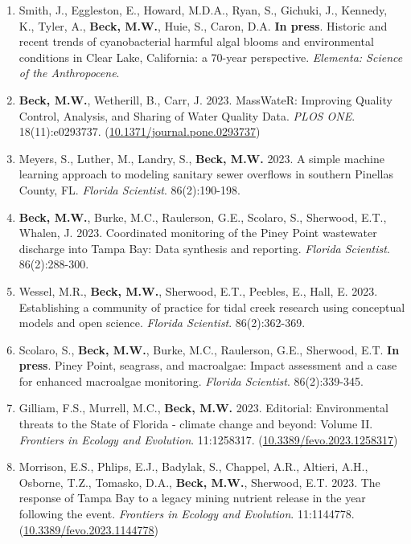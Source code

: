 \documentclass[letterpaper,12pt]{article}
\begin{document}
\begin{enumerate}

\item Smith, J., Eggleston, E., Howard, M.D.A., Ryan, S., Gichuki, J., Kennedy, K., Tyler, A., \textbf{Beck, M.W.}, Huie, S., Caron, D.A. \textbf{In press}. Historic and recent trends of cyanobacterial harmful algal blooms and environmental conditions in Clear Lake, California: a 70-year perspective. \textit{Elementa: Science of the Anthropocene}.

\item \textbf{Beck, M.W.}, Wetherill, B., Carr, J. 2023. MassWateR: Improving Quality Control, Analysis, and Sharing of Water Quality Data. \textit{PLOS ONE}. 18(11):e0293737. ({\footnotesize\href{https://doi.org/10.1371/journal.pone.0293737}{10.1371/journal.pone.0293737}})

\item Meyers, S., Luther, M., Landry, S., \textbf{Beck, M.W.} 2023. A simple machine learning approach to modeling sanitary sewer overflows in southern Pinellas County, FL. \textit{Florida Scientist}. 86(2):190-198.

\item \textbf{Beck, M.W.}, Burke, M.C., Raulerson, G.E., Scolaro, S., Sherwood, E.T., Whalen, J. 2023. Coordinated monitoring of the Piney Point wastewater discharge into Tampa Bay: Data synthesis and reporting. \textit{Florida Scientist}. 86(2):288-300.

\item Wessel, M.R., \textbf{Beck, M.W.}, Sherwood, E.T., Peebles, E., Hall, E. 2023. Establishing a community of practice for tidal creek research using conceptual models and open science. \textit{Florida Scientist}. 86(2):362-369. 

\item Scolaro, S., \textbf{Beck, M.W.}, Burke, M.C., Raulerson, G.E., Sherwood, E.T. \textbf{In press}. Piney Point, seagrass, and macroalgae: Impact assessment and a case for enhanced macroalgae monitoring. \textit{Florida Scientist}. 86(2):339-345.

\item Gilliam, F.S., Murrell, M.C., \textbf{Beck, M.W.} 2023. Editorial: Environmental threats to the State of Florida - climate change and beyond: Volume II. \textit{Frontiers in Ecology and Evolution}. 11:1258317. ({\footnotesize\href{https://doi.org/10.3389/fevo.2023.1258317}{10.3389/fevo.2023.1258317}})

\item Morrison, E.S., Phlips, E.J., Badylak, S., Chappel, A.R., Altieri, A.H., Osborne, T.Z., Tomasko, D.A., \textbf{Beck, M.W.}, Sherwood, E.T. 2023. The response of Tampa Bay to a legacy mining nutrient release in the year following the event. \textit{Frontiers in Ecology and Evolution}. 11:1144778. ({\footnotesize\href{https://doi.org/10.3389/fevo.2023.1144778}{10.3389/fevo.2023.1144778}})


\end{enumerate}
\end{document}
